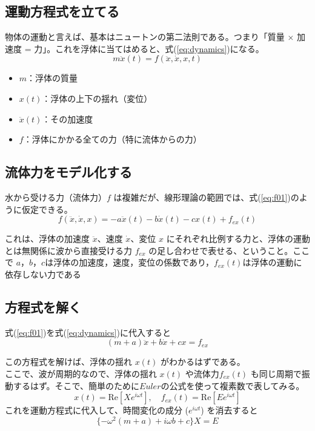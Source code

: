 \documentclass[dvipdfmx,a4paper]{jreport} %
\begin{document}
\subsection{運動方程式を立てる}
    物体の運動と言えば、基本はニュートンの第二法則である。つまり「質量 × 加速度 = 力」。これを浮体に当てはめると、式(\ref{eq:dynamics})になる。
    \begin{equation}
    \label{eq:dynamics}
        m\ddot{x}(t) = f(\ddot{x}, \dot{x}, x, t)
    \end{equation}
    \begin{itemize}
        \item $m$：浮体の質量
        \item $x(t)$：浮体の上下の揺れ（変位）
        \item $\ddot{x}(t)$：その加速度
        \item $f$：浮体にかかる全ての力（特に流体からの力）
    \end{itemize}
    

\subsection{流体力をモデル化する}
    水から受ける力（流体力）$f$ は複雑だが、線形理論の範囲では、式(\ref{eq:f01})のように仮定できる。
    \begin{equation}
    \label{eq:f01}
        f(\ddot{x}, \dot{x}, x) = -a\ddot{x}(t) - b\dot{x}(t) - cx(t) + f_{ex}(t)
    \end{equation}

    これは、浮体の加速度 $\ddot{x}$、速度 $\dot{x}$、変位 $x$ にそれぞれ比例する力と、浮体の運動とは無関係に波から直接受ける力 $f_{ex}$ の足し合わせで表せる、ということ。ここで $a，b，c$は浮体の加速度，速度，変位の係数であり，$f_{ex}(t)$は浮体の運動に依存しない力である

\subsection{方程式を解く}
    式(\ref{eq:f01})を式(\ref{eq:dynamics})に代入すると
    \begin{equation}
        (m+a)\ddot{x} + b\dot{x} + cx = f_{ex}
    \end{equation}
    
    この方程式を解けば、浮体の揺れ $x(t)$ がわかるはずである。\\
    ここで、波が周期的なので、浮体の揺れ $x(t)$ や流体力$f_{ex}(t)$ も同じ周期で振動するはず。そこで、簡単のために$Euler$の公式を使って複素数で表してみる。
    \begin{equation}
    \label{eq:x-c}
        x(t) = \text{Re}[Xe^{i\omega t}], \quad f_{ex}(t) = \text{Re}[E e^{i\omega t}]
    \end{equation}
    これを運動方程式に代入して、時間変化の成分 ($e^{i\omega t}$) を消去すると
    \begin{equation}
    \label{eq:x01}
        \{-\omega^2(m+a) + i\omega b + c\}X = E
    \end{equation}
\end{document}
